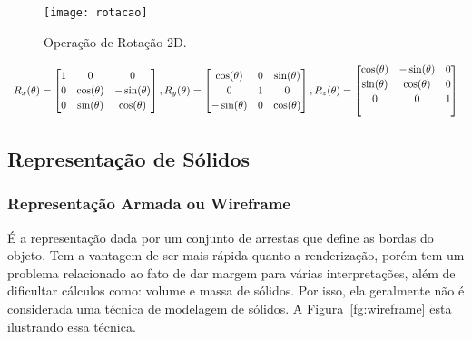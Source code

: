 \begin{figure}[ht!]
      \centering
	  \texttt{[image: rotacao]}
	  \caption{Operação de Rotação 2D.}
	  \label{fg:rotacao}
\end{figure} 
\begin{center}
\begin{equation}\label{eq:rotacao}
  \begin{array}{c c c}
     R_x(\theta) = \begin{bmatrix}
    1 & 0 & 0   \\[0.2em]
    0 & \cos(\theta) & -\sin(\theta)    \\[0.2em]
    0 & \sin(\theta) & \cos(\theta) \\
    \end{bmatrix}
    , 
    R_y(\theta) = \begin{bmatrix}
    \cos(\theta) & 0 & \sin(\theta) \\[0.2em]
    0 & 1 & 0   \\[0.2em]
    -\sin(\theta) & 0 & \cos(\theta)\\
    \end{bmatrix}
    ,
    R_z(\theta) = \begin{bmatrix}
    \cos(\theta) & -\sin(\theta) & 0\\[0.2em]
    \sin(\theta) & \cos(\theta) & 0\\[0.2em]
    0 & 0 & 1\\\ 
    \end{bmatrix}
    \end{array}
\end{equation}
\end{center}

\subsection{Representação de Sólidos}
\subsubsection{Representação Armada ou Wireframe}
É a representação dada por um conjunto de arrestas que define as bordas do objeto\cite{speck}. Tem a vantagem de ser mais rápida quanto a renderização, porém tem um problema relacionado ao fato de dar margem para várias interpretações, além de dificultar cálculos como: volume e massa de sólidos. Por isso, ela geralmente não é considerada uma técnica de modelagem de sólidos. A Figura~\ref{fg:wireframe} esta ilustrando essa técnica.

